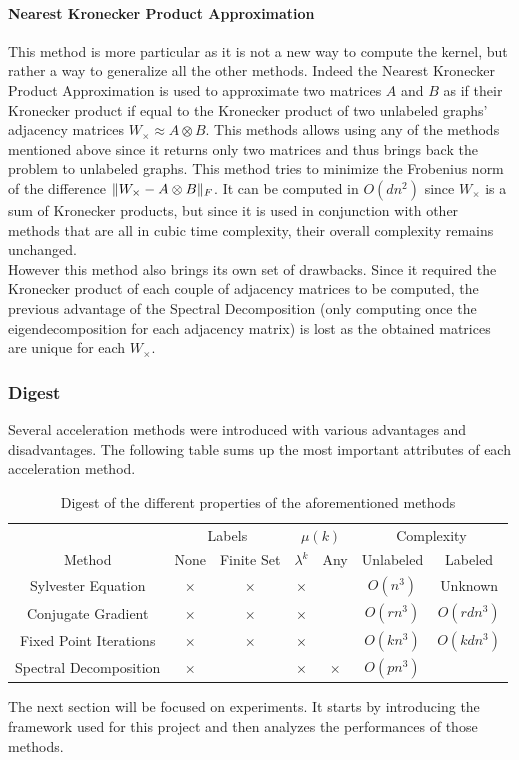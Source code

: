 \documentclass{article}
\DeclarePairedDelimiter{\norm}{\lVert}{\rVert}
\theoremstyle{definition}
\begin{document}
\paragraph{Nearest Kronecker Product Approximation}
This method is more particular as it is not a new way to compute the kernel, but rather a way to generalize all the other methods. Indeed the Nearest Kronecker Product Approximation\cite{van1993approximation} is used to approximate two matrices $A$ and $B$ as if their Kronecker product if equal to the Kronecker product of two unlabeled graphs' adjacency matrices $W_{\times} \approx A \otimes B$. This methods allows using any of the methods mentioned above since it returns only two matrices and thus brings back the problem to unlabeled graphs. This method tries to minimize the Frobenius norm of the difference  $\norm{W_\times - A\otimes B}_F$. It can be computed in $O(dn^2)$ since $W_\times$ is a sum of Kronecker products, but since it is used in conjunction with other methods that are all in cubic time complexity, their overall complexity remains unchanged.\\
However this method also brings its own set of drawbacks. Since it required the Kronecker product of each couple of adjacency matrices to be computed, the previous advantage of the Spectral Decomposition (only computing once the eigendecomposition for each adjacency matrix) is lost as the obtained matrices are unique for each $W_\times$.

\subsubsection{Digest}
Several acceleration methods were introduced with various advantages and disadvantages. The following table sums up the most important attributes of each acceleration method.
\begin{table}[!htb]
	\begin{center}
		\begin{tabular}{|c|c|c||c|c||c|c|}
			\hline
			& \multicolumn{2}{c||}{Labels} & \multicolumn{2}{c||}{$\mu(k)$} & \multicolumn{2}{c|}{Complexity}\\
			\cline{2-7}
			Method & None & Finite Set & ${\lambda}^{k}$ & Any & Unlabeled & Labeled\\
			\hline
			Sylvester Equation & $\times$ & $\times$\footnotemark & $\times$ & & $O(n^3)$ & Unknown\\
			Conjugate Gradient & $\times$ & $\times$ & $\times$ & & $O(rn^3)$ & $O(rdn^3)$ \\
			Fixed Point Iterations& $\times$ & $\times$ & $\times$ & & $O(kn^3)$ & $O(kdn^3)$\\
			Spectral Decomposition& $\times$ & & $\times$ & $\times$ & $O(pn^3)$ & \\
			\hline
		\end{tabular}
	\end{center}
	\caption{Digest of the different properties of the aforementioned methods}
\end{table}
The next section will be focused on experiments. It starts by introducing the framework used for this project and then analyzes the performances of those methods. 
\end{document}
